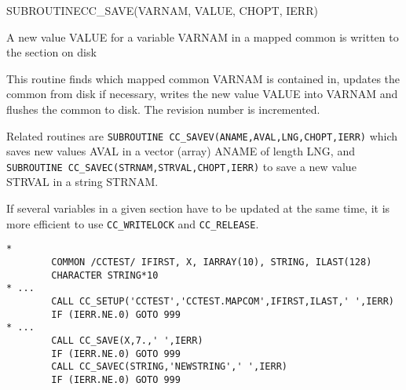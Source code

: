 \begin{routine} %
\subroutine
   {SUBROUTINE}{CC\_SAVE}{(VARNAM, VALUE, CHOPT, IERR)}
\begin{overview}
A new value VALUE for a variable VARNAM in a mapped common is written
to the section on disk
\end{overview}
\begin{argdeflist}
\end{argdeflist}
\begin{describe}
This routine finds which mapped common VARNAM is contained in, updates
the common from disk if necessary, writes the new value VALUE into VARNAM and
flushes the common to disk. The revision number is incremented.

Related routines are \verb|SUBROUTINE CC_SAVEV(ANAME,AVAL,LNG,CHOPT,IERR)|
which saves new values AVAL in a vector (array) ANAME of length LNG,
and \verb|SUBROUTINE CC_SAVEC(STRNAM,STRVAL,CHOPT,IERR)| to save a new
value STRVAL in a string STRNAM.

If several variables in a given section have to be updated at the same
time, it is more efficient to use \verb|CC_WRITELOCK| and \verb|CC_RELEASE|.

\end{describe}
\begin{options}
\end{options}
\begin{returncodes}
\end{returncodes}
\begin{examplecode}\begin{verbatim}
*
        COMMON /CCTEST/ IFIRST, X, IARRAY(10), STRING, ILAST(128)
        CHARACTER STRING*10
* ...
        CALL CC_SETUP('CCTEST','CCTEST.MAPCOM',IFIRST,ILAST,' ',IERR)
        IF (IERR.NE.0) GOTO 999
* ...
        CALL CC_SAVE(X,7.,' ',IERR)
        IF (IERR.NE.0) GOTO 999
        CALL CC_SAVEC(STRING,'NEWSTRING',' ',IERR)
        IF (IERR.NE.0) GOTO 999
\end{verbatim}\end{examplecode}
\end{routine}

